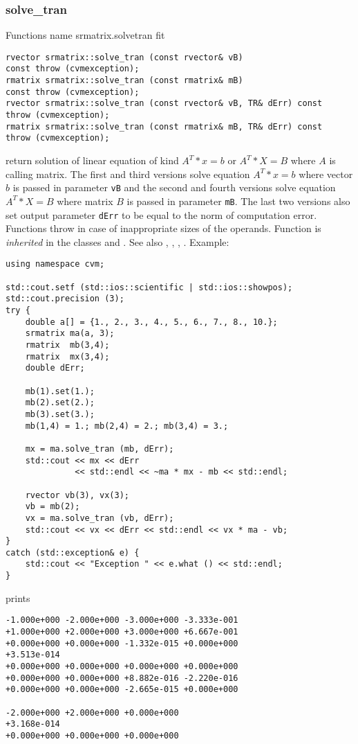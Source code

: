\subsubsection{solve\_tran}
Functions%
\pdfdest name {srmatrix.solvetran} fit
\begin{verbatim}
rvector srmatrix::solve_tran (const rvector& vB)
const throw (cvmexception);
rmatrix srmatrix::solve_tran (const rmatrix& mB)
const throw (cvmexception);
rvector srmatrix::solve_tran (const rvector& vB, TR& dErr) const
throw (cvmexception);
rmatrix srmatrix::solve_tran (const rmatrix& mB, TR& dErr) const
throw (cvmexception);
\end{verbatim}
return  solution of  linear equation of kind $A^T*x=b$ or $A^T*X=B$
where $A$ is  calling matrix. The first and third versions
solve  equation $A^T*x=b$ where vector $b$ is passed in 
 parameter \verb"vB"
and the second and fourth versions
solve equation $A^T*X=B$ where matrix $B$ is passed 
in parameter \verb"mB".
The last two versions also set output parameter \verb"dErr" to be equal
to the norm of computation error.
Functions throw 
in case of inappropriate sizes of the operands.
Function is \emph{inherited} in the classes
and .
See also
,
,
,
.
Example:
\begin{Verbatim}
using namespace cvm;

std::cout.setf (std::ios::scientific | std::ios::showpos); 
std::cout.precision (3);
try {
    double a[] = {1., 2., 3., 4., 5., 6., 7., 8., 10.};
    srmatrix ma(a, 3);
    rmatrix  mb(3,4);
    rmatrix  mx(3,4);
    double dErr;

    mb(1).set(1.);
    mb(2).set(2.);
    mb(3).set(3.);
    mb(1,4) = 1.; mb(2,4) = 2.; mb(3,4) = 3.;

    mx = ma.solve_tran (mb, dErr);
    std::cout << mx << dErr 
              << std::endl << ~ma * mx - mb << std::endl;

    rvector vb(3), vx(3);
    vb = mb(2);
    vx = ma.solve_tran (vb, dErr);
    std::cout << vx << dErr << std::endl << vx * ma - vb;
}
catch (std::exception& e) {
    std::cout << "Exception " << e.what () << std::endl;
}
\end{Verbatim}
prints
\begin{Verbatim}
-1.000e+000 -2.000e+000 -3.000e+000 -3.333e-001
+1.000e+000 +2.000e+000 +3.000e+000 +6.667e-001
+0.000e+000 +0.000e+000 -1.332e-015 +0.000e+000
+3.513e-014
+0.000e+000 +0.000e+000 +0.000e+000 +0.000e+000
+0.000e+000 +0.000e+000 +8.882e-016 -2.220e-016
+0.000e+000 +0.000e+000 -2.665e-015 +0.000e+000

-2.000e+000 +2.000e+000 +0.000e+000
+3.168e-014
+0.000e+000 +0.000e+000 +0.000e+000
\end{Verbatim}
\newpage



